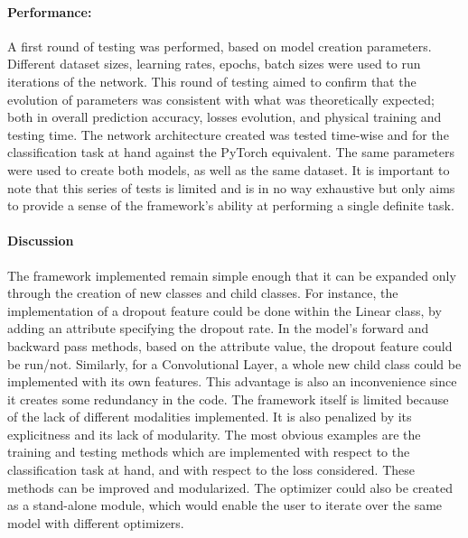 \documentclass[10pt, a4paper]{article}
\begin{document}
\paragraph{Performance:}A first round of testing was performed, based on model creation parameters. Different dataset sizes, learning rates, epochs, batch sizes were used to run iterations of the network. This round of testing aimed to confirm that the evolution of parameters was consistent with what was theoretically expected; both in overall prediction accuracy, losses evolution, and physical training and testing time. 
The network architecture created was tested time-wise and for the classification task at hand against the PyTorch equivalent. The same parameters were used to create both models, as well as the same dataset.
It is important to note that this series of tests is limited and is in no way exhaustive but only aims to provide a sense of the framework's ability at performing a single definite task.

\paragraph{Discussion}The framework implemented remain simple enough that it can be expanded only through the creation of new classes and child classes. For instance, the implementation of a dropout feature could be done within the Linear class, by adding an attribute specifying the dropout rate. In the model's forward and backward pass methods, based on the attribute value, the dropout feature could be run/not. Similarly, for a Convolutional Layer, a whole new child class could be implemented with its own features. 
This advantage is also an inconvenience since it creates some redundancy in the code. 
The framework itself is limited because of the lack of different modalities implemented. It is also penalized by its explicitness and its lack of modularity.
The most obvious examples are the training and testing methods which are implemented with respect to the classification task at hand, and with respect to the loss considered. These methods can be improved and modularized. 
The optimizer could also be created as a stand-alone module, which would enable the user to iterate over the same model with different optimizers.
\end{document}
